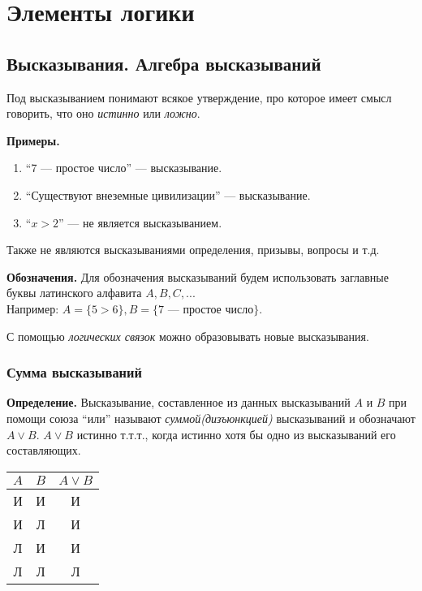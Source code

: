 \documentclass{article}
\begin{document}
    \section{Элементы логики}

    \subsection{Высказывания. Алгебра высказываний}

    Под высказыванием понимают всякое утверждение, про которое имеет смысл говорить, что оно \textit{истинно} или \textit{ложно}.

    \textbf{Примеры.}
    \begin{enumerate}
        \item ``7 --- простое число'' --- высказывание.
        \item ``Существуют внеземные цивилизации'' --- высказывание.
        \item ``\(x>2\)'' --- не является высказыванием.
    \end{enumerate}
    Также не являются высказываниями определения, призывы, вопросы и т.д.

    \textbf{Обозначения.} Для обозначения высказываний будем использовать заглавные буквы латинского алфавита \(A, B, C, ...\)\\
    Например: \(A=\{5>6\}, B=\{\textrm{7 --- простое число}\}\).

    С помощью \textit{логических связок} можно образовывать новые высказывания.

    \subsubsection{Сумма высказываний}

    \textbf{Определение.} Высказывание, составленное из данных высказываний \(A\) и \(B\) при помощи союза ``или'' называют \textit{суммой(дизъюнкцией)} высказываний и обозначают \(A \vee B\). \(A \vee B\) истинно т.т.т., когда истинно хотя бы одно из высказываний его составляющих.
    
    \begin{center}
        \begin{tabular}{||c | c | c||}
            \hline
            \(A\) &  \(B\) & \(A \vee B\)\\
            \hline \hline
            И & И & И\\
            \hline
            И & Л & И\\
            \hline
            Л & И & И\\
            \hline
            Л & Л & Л\\
            \hline
        \end{tabular}
    \end{center}
\end{document}
